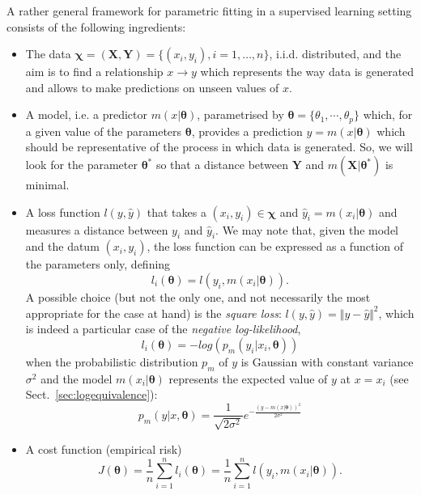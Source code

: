 \documentclass{article}
\begin{document}
A rather general framework for parametric fitting in a supervised learning setting consists of the following ingredients:
\begin{itemize}
    \item The data $\boldsymbol{\chi}=(\mathbf{X},\mathbf{Y})=\lbrace(x_i,y_i),i=1,\ldots,n\rbrace$, i.i.d. distributed, and the aim is to find a
        relationship $x \to y$ which represents the way data is generated and allows to make predictions on unseen values of $x$. 
    \item A model, i.e. a predictor $m(x|\boldsymbol{\theta})$, parametrised by $\boldsymbol{\theta}= \lbrace\theta_1,\cdots,\theta_p\rbrace$
    which, for a given value of the parameters $\boldsymbol{\theta}$, provides a prediction  $y=m(x|\boldsymbol{\theta})$
    which should be representative of the process in which data is generated. So, we will look for the parameter $\boldsymbol{\theta}^*$ so that a distance between $\boldsymbol{Y}$ and $m(\boldsymbol{X}|\boldsymbol{\theta}^*)$
    is minimal.
    \item A loss function $l(y,\hat{y})$ that takes a $(x_i,y_i)\in\boldsymbol{\chi}$ and $\hat{y}_i=m(x_i|\boldsymbol{\theta})$
    and measures a distance between $y_i$ and $\hat{y}_i$. 
        We may note that, given the model and the datum $(x_i,y_i)$, the loss function can be expressed as a function of the parameters only, defining
    \begin{equation}\label{eq:lossfun}
    l_i(\boldsymbol{\theta})=l(y_i,m(x_i|\boldsymbol{\theta})).
    \end{equation}
    A possible choice (but not the only one, and not necessarily the most appropriate for the case at hand) is the \emph{square loss}: $l(y,\hat{y})=\Vert y-\hat{y}\Vert^2$, which is indeed a particular case of the \emph{negative log-likelihood},
     \begin{equation}\label{eq:lossfunnl}
 l_i(\boldsymbol{\theta})=-log(p_m(y_i|x_i,\boldsymbol{\theta}))
 \end{equation}
   when the probabilistic distribution $p_m$ of $y$ is Gaussian with constant variance $\sigma^2$ and the model $m(x_i|\boldsymbol{\theta})$ represents the expected value of $y$ at $x=x_i$ (see Sect.~\ref{sec:logequivalence}):
   \[
      p_m(y|x,\boldsymbol{\theta})=\frac{1}{\sqrt{2\sigma^2}}e^{-\frac{(y-m(x|\boldsymbol{\theta}))^2}{2\sigma^2}}
   \]
    \item A cost function (empirical risk)
    \begin{equation}\label{eq:empiricalr}
    J(\boldsymbol{\theta})=\frac{1}{n}\sum_{i=1}^{n} l_i(\boldsymbol{\theta})=\frac{1}{n}\sum_{i=1}^{n}l(y_i,m(x_i|\boldsymbol{\theta})).

\end{equation}
\end{itemize}
\end{document}
